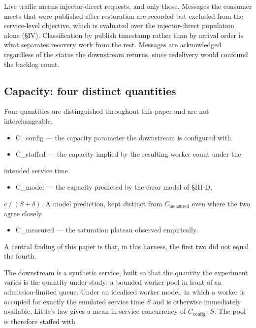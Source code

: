 \documentclass{ieeeaccess}
\begin{document}
Live traffic means injector-direct requests, and only those. Messages the consumer meets that were published after restoration are recorded but excluded from the service-level objective, which is evaluated over the injector-direct population alone (\S{}IV). Classification by publish timestamp rather than by arrival order is what separates recovery work from the rest. Messages are acknowledged regardless of the status the downstream returns, since redelivery would confound the backlog count.

\subsection{Capacity: four distinct quantities}

Four quantities are distinguished throughout this paper and are not interchangeable.

\begin{itemize}
\item C\_config --- the capacity parameter the downstream is configured with.
\item C\_staffed --- the capacity implied by the resulting worker count under the
\end{itemize}

intended service time.

\begin{itemize}
\item C\_model --- the capacity predicted by the error model of \S{}III-D,
\end{itemize}

$c \mathbin{/} (S + \delta)$. A model prediction, kept distinct from $C_{\mathrm{measured}}$ even where the two agree closely.

\begin{itemize}
\item C\_measured --- the saturation plateau observed empirically.
\end{itemize}

A central finding of this paper is that, in this harness, the first two did not equal the fourth.

The downstream is a synthetic service, built so that the quantity the experiment varies is the quantity under study: a bounded worker pool in front of an admission-limited queue. Under an idealised worker model, in which a worker is occupied for exactly the emulated service time $S$ and is otherwise immediately available, Little's law \cite{little} gives a mean in-service concurrency of $C_{\mathrm{config}} \cdot S$. The pool is therefore staffed with
\end{document}
